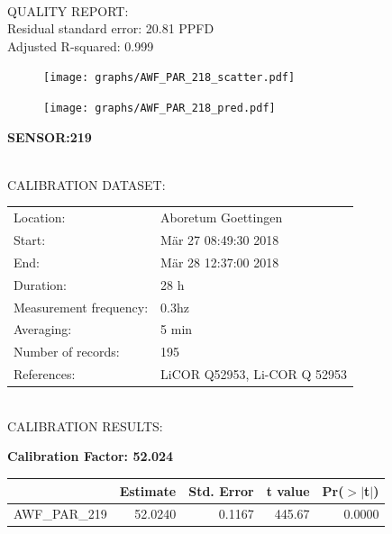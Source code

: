 \documentclass[oneside]{report}
\begin{document}
\hrulefill\\
QUALITY REPORT:\\
Residual standard error: 20.81 PPFD\\
Adjusted R-squared: 0.999



\begin{figure}[H]
  \centering
  \texttt{[image: graphs/AWF\_PAR\_218\_scatter.pdf]}
\end{figure}




\begin{figure}[H]
  \centering
  \texttt{[image: graphs/AWF\_PAR\_218\_pred.pdf]}
\end{figure}

\pagebreak


\begin{center}
\large{\textbf{SENSOR:219}}\\
\end{center}

\hrulefill\\
CALIBRATION DATASET:\\
\begin{table}[h!]
  \centering
  \label{tab:table1}
  \begin{tabular}{ll}
    Location: & Aboretum Goettingen\\ 
    
    
    Start:  & Mär 27 08:49:30 2018 \\
    End:   & Mär 28 12:37:00 2018\\ 
    Duration: & 28 h\\
    Measurement frequency: & 0.3hz\\
    Averaging:  &5 min\\
    Number of records: & 195 \\
    References: & LiCOR Q52953, Li-COR Q 52953 \\
  \end{tabular}
\end{table}

\hrulefill\\
CALIBRATION RESULTS:\\


\begin{center}
\textbf{\large{Calibration Factor: 52.024}}\\
\end{center}
\begin{table}[ht]
\centering
\begin{tabular}{rrrrr}
  \hline
 & Estimate & Std. Error & t value & Pr($>$$|$t$|$) \\ 
  \hline
AWF\_PAR\_219 & 52.0240 & 0.1167 & 445.67 & 0.0000 \\ 
   \hline
\end{tabular}
\end{table}
\end{document}
